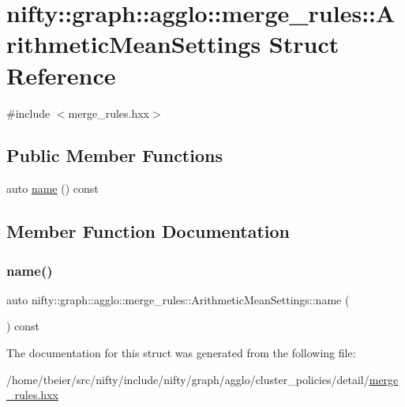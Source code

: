 \hypertarget{structnifty_1_1graph_1_1agglo_1_1merge__rules_1_1ArithmeticMeanSettings}{}\section{nifty\+:\+:graph\+:\+:agglo\+:\+:merge\+\_\+rules\+:\+:Arithmetic\+Mean\+Settings Struct Reference}
\label{structnifty_1_1graph_1_1agglo_1_1merge__rules_1_1ArithmeticMeanSettings}


{\ttfamily \#include $<$merge\+\_\+rules.\+hxx$>$}

\subsection*{Public Member Functions}
\begin{DoxyCompactItemize}
\item 
auto \hyperlink{structnifty_1_1graph_1_1agglo_1_1merge__rules_1_1ArithmeticMeanSettings_a2848d5939420936b62d5946da2483253}{name} () const
\end{DoxyCompactItemize}


\subsection{Member Function Documentation}
\mbox{\label{structnifty_1_1graph_1_1agglo_1_1merge__rules_1_1ArithmeticMeanSettings_a2848d5939420936b62d5946da2483253}} 
\subsubsection{\texorpdfstring{name()}{name()}}
{\footnotesize\ttfamily auto nifty\+::graph\+::agglo\+::merge\+\_\+rules\+::\+Arithmetic\+Mean\+Settings\+::name (\begin{DoxyParamCaption}{ }\end{DoxyParamCaption}) const\hspace{0.3cm}{\ttfamily [inline]}}



The documentation for this struct was generated from the following file\+:\begin{DoxyCompactItemize}
\item 
/home/tbeier/src/nifty/include/nifty/graph/agglo/cluster\+\_\+policies/detail/\hyperlink{merge__rules_8hxx}{merge\+\_\+rules.\+hxx}\end{DoxyCompactItemize}
